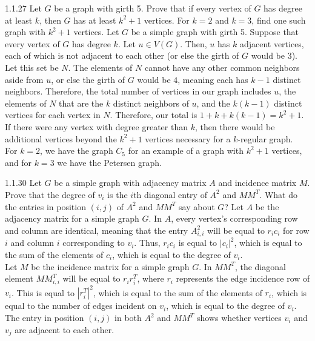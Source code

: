 \documentclass[9pt]{extarticle}
\begin{document}
\begin{problem}{1.1.27}
  Let $G$ be a graph with girth 5. Prove that if every vertex of $G$ has degree at least $k$, then $G$ has at least $k^2+1$ vertices. For $k=2$ and $k=3$, find one such graph with $k^2+1$ vertices.
  \tcblower
  Let $G$ be a simple graph with girth 5. Suppose that every vertex of $G$ has degree $k$. Let $u\in V(G)$. Then, $u$ has $k$ adjacent vertices, each of which is not adjacent to each other (or else the girth of $G$ would be $3$). Let this set be $N$. The elements of $N$ cannot have any other common neighbors aside from $u$, or else the girth of $G$ would be $4$, meaning each has $k-1$ distinct neighbors. Therefore, the total number of vertices in our graph includes $u$, the elements of $N$ that are the $k$ distinct neighbors of $u$, and the $k(k-1)$ distinct vertices for each vertex in $N$. Therefore, our total is $1 + k + k(k-1) = k^2 + 1$.\\

  If there were any vertex with degree greater than $k$, then there would be additional vertices beyond the $k^2 + 1$ vertices necessary for a $k$-regular graph.\\

  For  $k=2$, we have the graph $C_5$ for an example of a graph with $k^2 + 1$ vertices, and for $k=3$ we have the Petersen graph.
\end{problem}
\begin{problem}{1.1.30}
    Let $G$ be a simple graph with adjacency matrix $A$ and incidence matrix $M$. Prove that the degree of $v_i$ is the $i$th diagonal entry of $A^2$ and $MM^T$. What do the entries in position $(i,j)$ of $A^2$ and $MM^T$ say about $G$?
\tcblower
  Let $A$ be the adjacency matrix for a simple graph $G$. In $A$, every vertex's corresponding row and column are identical, meaning that the entry $A^2_{i,i}$ will be equal to $r_ic_i$ for row $i$ and column $i$ corresponding to $v_i$. Thus, $r_ic_i$ is equal to $|c_i|^2$, which is equal to the sum of the elements of $c_i$, which is equal to the degree of $v_i$.\\

  Let $M$ be the incidence matrix for a simple graph $G$. In $MM^T$, the diagonal element $MM^T_{i,i}$ will be equal to $r_i r_i^T$, where $r_i$ represents the edge incidence row of $v_i$. This is equal to $\left|r_i^T\right|^2$, which is equal to the sum of the elements of $r_i$, which is equal to the number of edges incident on $v_i$, which is equal to the degree of $v_i$.\\

  The entry in position $(i,j)$ in both $A^2$ and $MM^T$ shows whether vertices $v_i$ and $v_j$ are adjacent to each other.
\end{problem}
\end{document}
